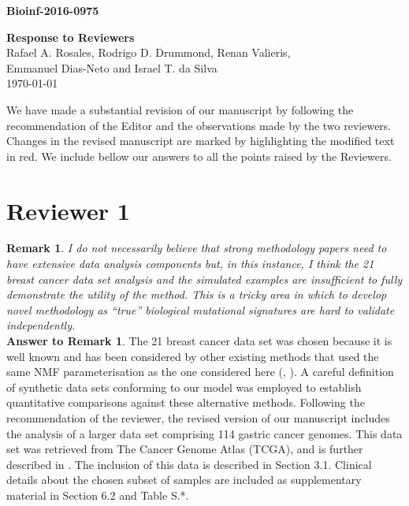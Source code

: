 \documentclass[11pt]{amsart}
\begin{document}
\title[BIOINF-2016-0975]{}

{\bf Bioinf-2016-0975}\hfill\\[1em]

\begin{center}
{\Large\bf Response to Reviewers}\\[2em]

{\large Rafael A. Rosales,
  Rodrigo D. Drummond,
  Renan Valieris,\\[0.25em]
  Emmanuel Dias-Neto and
  Israel T. da Silva}\\[1.5em]

\today\\[2em]
\end{center}

We have made a substantial revision of our manuscript by following the recommendation of the Editor and the observations made by the two reviewers. Changes in the revised manuscript are marked by
highlighting the modified text in red. We include bellow our answers to all the points raised by the Reviewers.

\section*{Reviewer 1}

\textbf{Remark 1}. \emph{I do not necessarily believe that strong
methodology papers need to have extensive data analysis components
but, in this instance, I think the 21 breast cancer data set analysis and the simulated examples are insufficient to fully demonstrate the utility of the method. This is a tricky area in which to develop novel methodology as ``true'' biological mutational signatures are hard to validate independently.}
\\

\textbf{Answer to Remark 1}. The 21 breast cancer data set was chosen because it is well known and has been considered by other existing methods that used the same NMF parameterisation as the one considered here (\cite{A}, \cite{FICMV}). A careful definition of synthetic data sets conforming to our model was employed to establish quantitative comparisons against these alternative methods.  Following the recommendation of the reviewer, the revised
version of our manuscript includes the analysis of a larger data set comprising 114 gastric cancer genomes. This data set was retrieved from The Cancer Genome Atlas (TCGA), and is further described in \cite{gastrico}. The inclusion of this data is described in Section 3.1. Clinical details about the chosen subset of samples are included as supplementary material in Section 6.2 and Table S.*.
\\
\end{document}
